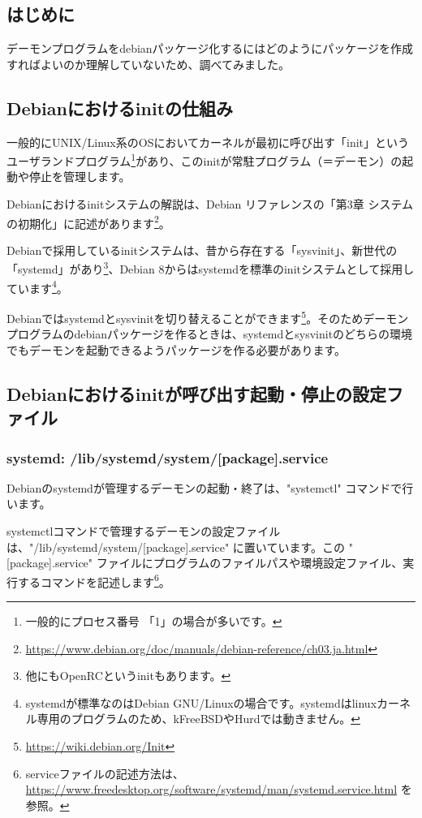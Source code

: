 \documentclass[mingoth,a4paper]{jsarticle}
\begin{document}
\subsection{はじめに}

デーモンプログラムをdebianパッケージ化するにはどのようにパッケージを作成すればよいのか理解していないため、調べてみました。


\subsection{Debianにおけるinitの仕組み}

一般的にUNIX/Linux系のOSにおいてカーネルが最初に呼び出す「init」というユーザランドプログラム\footnote{一般的にプロセス番号 「1」の場合が多いです。}があり、このinitが常駐プログラム（＝デーモン）の起動や停止を管理します。


Debianにおけるinitシステムの解説は、Debian リファレンスの「第3章 システムの初期化」に記述があります\footnote{\url{https://www.debian.org/doc/manuals/debian-reference/ch03.ja.html}}。

Debianで採用しているinitシステムは、昔から存在する「sysvinit」、新世代の「systemd」があり\footnote{他にもOpenRCというinitもあります。}、Debian 8からはsystemdを標準のinitシステムとして採用しています\footnote{systemdが標準なのはDebian GNU/Linuxの場合です。systemdはlinuxカーネル専用のプログラムのため、kFreeBSDやHurdでは動きません。}。


Debianではsystemdとsysvinitを切り替えることができます\footnote{\url{https://wiki.debian.org/Init}}。そのためデーモンプログラムのdebianパッケージを作るときは、systemdとsysvinitのどちらの環境でもデーモンを起動できるようパッケージを作る必要があります。


\subsection{Debianにおけるinitが呼び出す起動・停止の設定ファイル}

\subsubsection{systemd: /lib/systemd/system/[package].service}

Debianのsystemdが管理するデーモンの起動・終了は、"systemctl" コマンドで行います。


systemctlコマンドで管理するデーモンの設定ファイルは、"/lib/systemd/system/[package].service" に置いています。この "[package].service" ファイルにプログラムのファイルパスや環境設定ファイル、実行するコマンドを記述します\footnote{serviceファイルの記述方法は、\url{https://www.freedesktop.org/software/systemd/man/systemd.service.html} を参照。}。
\end{document}
